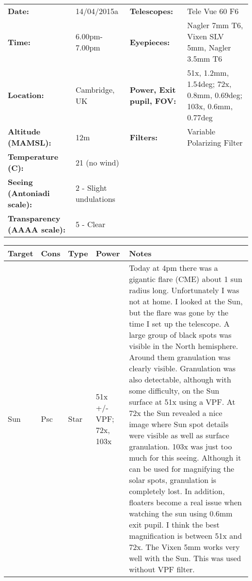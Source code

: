 \begin{tabular}{ p{1.7in} p{1.2in} p{1.5in} p{4.2in}}
{\bf Date:} & 14/04/2015a & {\bf Telescopes:} & Tele Vue 60 F6 \\ 
{\bf Time:} & 6.00pm-7.00pm & {\bf Eyepieces:} & Nagler 7mm T6, Vixen SLV 5mm, Nagler 3.5mm T6 \\ 
{\bf Location:} & Cambridge, UK & {\bf Power, Exit pupil, FOV:} & 51x, 1.2mm, 1.54deg; 72x, 0.8mm, 0.69deg; 103x, 0.6mm, 0.77deg \\ 
{\bf Altitude (MAMSL):} & 12m & {\bf Filters:} & Variable Polarizing Filter \\ 
{\bf Temperature (C):} & 21 (no wind) & & \\ 
{\bf Seeing (Antoniadi scale):} & 2 - Slight undulations & & \\ 
{\bf Transparency (AAAA scale):} & 5 - Clear & & \\ 
\end{tabular}
\centering 
\begin{longtable}{ p{0.8in}  p{0.3in}  p{0.5in}  p{0.9in}  p{5.8in} }
\hline 
{\bf Target} & {\bf Cons} & {\bf Type} & {\bf Power} & {\bf Notes} \\ 
\hline 
Sun & Psc & Star & 51x +/- VPF; 72x, 103x & Today at 4pm there was a gigantic flare (CME) about 1 sun radius long. Unfortunately I was not at home. I looked at the Sun, but the flare was gone by the time I set up the telescope. A large group of black spots was visible in the North hemisphere. Around them granulation was clearly visible. Granulation was also detectable, although with some difficulty, on the Sun surface at 51x using a VPF. At 72x the Sun revealed a nice image where Sun spot details were visible as well as surface granulation. 103x was just too much for this seeing. Although it can be used for magnifying the solar spots, granulation is completely lost. In addition, floaters become a real issue when watching the sun using 0.6mm exit pupil. I think the best magnification is between 51x and 72x. The Vixen 5mm works very well with the Sun. This was used without VPF filter. \\ 
\hline 
\end{longtable} 
